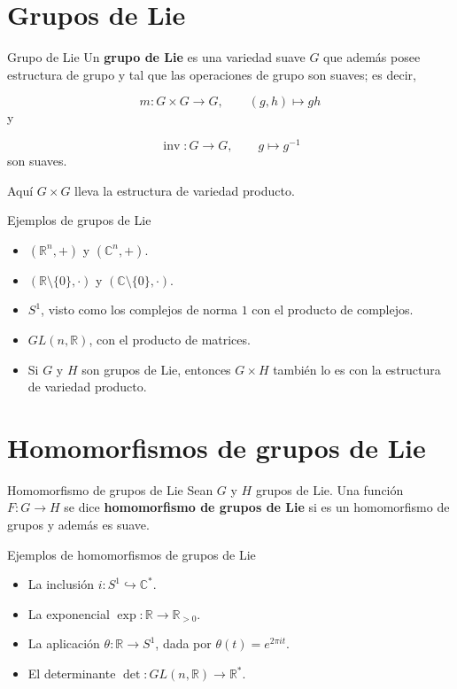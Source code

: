 \section{Grupos de Lie}
\begin{bookdefinition}{Grupo de Lie}
Un \textbf{grupo de Lie} es una variedad suave $G$ que además posee estructura de grupo y tal que las operaciones de grupo son suaves; es decir,

\[
m:G\times G\to G,\qquad (g,h)\mapsto gh
\]
y

\[
\operatorname{inv}:G\to G,\qquad g\mapsto g^{-1}
\]
son suaves.

Aquí $G\times G$ lleva la estructura de variedad producto.

\end{bookdefinition}
\begin{bookexample}{Ejemplos de grupos de Lie}
\begin{itemize}
\item $(\mathbb{R}^n,+)$ y $(\mathbb{C}^n,+)$.
\item $(\mathbb{R}\setminus\{0\},\cdot)$ y $(\mathbb{C}\setminus\{0\},\cdot)$.
\item $S^1$, visto como los complejos de norma $1$ con el producto de complejos.
\item $GL(n,\mathbb{R})$, con el producto de matrices.
\item Si $G$ y $H$ son grupos de Lie, entonces $G\times H$ también lo es con la estructura de variedad producto.
\end{itemize}
\end{bookexample}
\section{Homomorfismos de grupos de Lie}
\begin{bookdefinition}{Homomorfismo de grupos de Lie}
Sean $G$ y $H$ grupos de Lie. Una función $F:G\to H$ se dice \textbf{homomorfismo de grupos de Lie} si es un homomorfismo de grupos y además es suave.

\end{bookdefinition}
\begin{bookexample}{Ejemplos de homomorfismos de grupos de Lie}
\begin{itemize}
\item La inclusión $i:S^1\hookrightarrow\mathbb{C}^\ast$.
\item La exponencial $\exp:\mathbb{R}\to\mathbb{R}_{>0}$.
\item La aplicación $\theta:\mathbb{R}\to S^1$, dada por $\theta(t)=e^{2\pi i t}$.
\item El determinante $\det:GL(n,\mathbb{R})\to\mathbb{R}^\ast$.
\end{itemize}
\end{bookexample}
